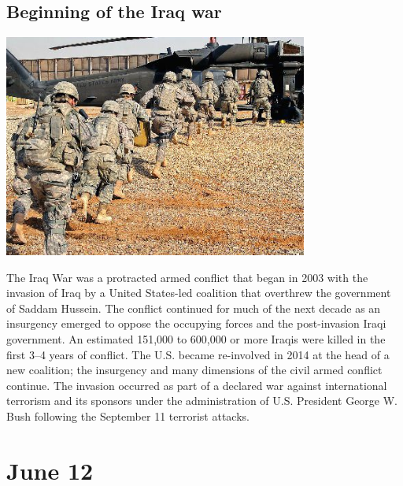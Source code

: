 \documentclass[11pt]{report}
\begin{document}
\subsection{Beginning of the Iraq war}
\vspace{2mm}\begin{center}\includegraphics[width=10cm]{./img/iraqWar.jpg}\end{center}
The Iraq War was a protracted armed conflict that began in 2003 with the invasion of Iraq by a United States-led coalition that overthrew the government of Saddam Hussein. The conflict continued for much of the next decade as an insurgency emerged to oppose the occupying forces and the post-invasion Iraqi government. An estimated 151,000 to 600,000 or more Iraqis were killed in the first 3–4 years of conflict. The U.S. became re-involved in 2014 at the head of a new coalition; the insurgency and many dimensions of the civil armed conflict continue. The invasion occurred as part of a declared war against international terrorism and its sponsors under the administration of U.S. President George W. Bush following the September 11 terrorist attacks.
\section{June 12}
\end{document}
